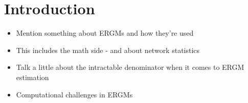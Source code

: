 \section{Introduction}

\begin{itemize}
\item Mention something about ERGMs and how they're used
\item This includes the math side - and about network statistics
\item Talk a little about the intractable denominator when it comes to ERGM estimation
\item Computational challenges in ERGMs
\end{itemize}